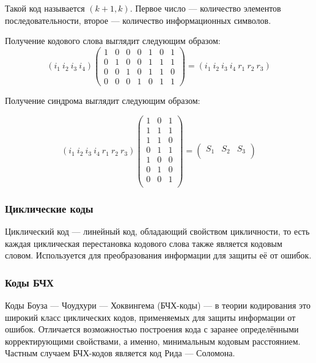 Такой код называется $(k+1,k)$. Первое число — количество элементов последовательности, второе — количество информационных символов.

Получение кодового слова выглядит следующим образом:
\begin{equation}
( i_1 \> i_2 \> i_3 \> i_4 )  \begin{pmatrix}
1 & 0 & 0 & 0 & 1 & 0 & 1 \\
0 & 1 & 0 & 0 & 1 & 1 & 1 \\         
0 & 0 & 1 & 0 & 1 & 1 & 0 \\
0 & 0 & 0 & 1 & 0 & 1 & 1
\end{pmatrix} = ( i_1 \> i_2 \> i_3 \> i_4  \> r_1  \> r_2  \> r_3)
\end{equation}

Получение синдрома выглядит следующим образом:

\begin{equation}
(i_{1} \> i_{2} \> i_{3} \> i_{4} \> r_{1} \> r_{2} \> r_{3} )  \begin{pmatrix}
1 & 0 & 1 \\
1 & 1 & 1 \\
1 & 1 & 0 \\
0 & 1 & 1 \\
1 & 0 & 0 \\
0 & 1 & 0 \\
0 & 0 & 1 \\ 
\end{pmatrix} = \begin{pmatrix}S_{1}&S_{2}&S_{3}\\\end{pmatrix}
\end{equation}

\subsubsection{Циклические коды}
Циклический код — линейный код, обладающий свойством цикличности, то есть каждая циклическая перестановка кодового слова также является кодовым словом. Используется для преобразования информации для защиты её от ошибок.

\subsubsection{Коды БЧХ}
Коды Боуза — Чоудхури — Хоквингема (БЧХ-коды) — в теории кодирования это широкий класс циклических кодов, применяемых для защиты информации от ошибок. Отличается возможностью построения кода с заранее определёнными корректирующими свойствами, а именно, минимальным кодовым расстоянием. Частным случаем БЧХ-кодов является код Рида — Соломона.

